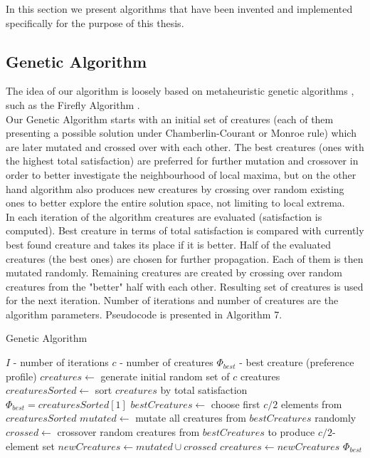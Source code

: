 In this section we present algorithms that have been invented and implemented specifically for the purpose of this thesis.

\subsection{Genetic Algorithm}

The idea of our algorithm is loosely based on metaheuristic genetic algorithms \cite{13}, such as the Firefly Algorithm \cite{13, 6}.
\\

Our Genetic Algorithm starts with an initial set of creatures (each of them presenting a possible solution under Chamberlin-Courant or Monroe rule) which are later mutated and crossed over with each other. The best creatures (ones with the highest total satisfaction) are preferred for further mutation and crossover in order to better investigate the neighbourhood of local maxima, but on the other hand algorithm also produces new creatures by crossing over random existing ones to better explore the entire solution space, not limiting to local extrema.
\\

In each iteration of the algorithm creatures are evaluated (satisfaction is computed). Best creature in terms of total satisfaction is compared with currently best found creature and takes its place if it is better. Half of the evaluated creatures (the best ones) are chosen for further propagation. Each of them is then mutated randomly. Remaining creatures are created by crossing over random creatures from the "better" half with each other. Resulting set of creatures is used for the next iteration. Number of iterations and number of creatures are the algorithm parameters. Pseudocode is presented in Algorithm 7.

\begin{algorithm}
\caption{Genetic Algorithm}\label{euclid}
\begin{algorithmic}[1]
		\State $I$ - number of iterations
		\State $c$ - number of creatures
		\State $\Phi_{best}$ - best creature (preference profile)
		\State $creatures \gets$ generate initial random set of $c$ creatures
			\State $creaturesSorted \gets$ sort $creatures$ by total satisfaction
				\State $\Phi_{best} = creaturesSorted[1]$
			\EndIf
			\State $bestCreatures \gets$ choose first $c/2$ elements from $creaturesSorted$
			\State $mutated \gets$ mutate all creatures from $bestCreatures$ randomly
			\State $crossed \gets$ crossover random creatures from $bestCreatures$ to produce $c/2$-element set
			\State $newCreatures \gets mutated \cup crossed$
			\State $creatures \gets newCreatures$
		\EndFor
		\State \Return $\Phi_{best}$
	\EndProcedure
\end{algorithmic}
\end{algorithm}


